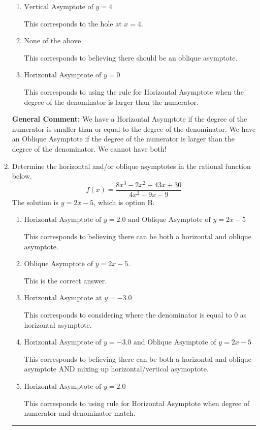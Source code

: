 \documentclass{extbook}[14pt]
\newcommand{\litem}[1]{\item #1

\rule{\textwidth}{0.4pt}}
\begin{document}
\begin{enumerate}
{\begin{enumerate}[label=\Alph*.]
This corresponds to the hole at $x = 0.500$.
\item \( \text{Vertical Asymptote of } y = 4  \)

This corresponds to the hole at $x = 4$.
\item \( \text{None of the above} \)

This corresponds to believing there should be an oblique asymptote.
\item \( \text{Horizontal Asymptote of } y = 0  \)

This corresponds to using the rule for Horizontal Asymptote when the degree of the denominator is larger than the numerator.
\end{enumerate}

\textbf{General Comment:} We have a Horizontal Asymptote if the degree of the numerator is smaller than or equal to the degree of the denominator. We have an Oblique Asymptote if the degree of the numerator is larger than the degree of the denominator. We cannot have both!
}
\litem{
Determine the horizontal and/or oblique asymptotes in the rational function below.
\[ f(x) = \frac{8x^{3} -2 x^{2} -43 x + 30}{4x^{2} +9 x -9} \]The solution is \( y = 2x -5 \), which is option B.\begin{enumerate}[label=\Alph*.]
\item \( \text{Horizontal Asymptote of } y = 2.0 \text{ and Oblique Asymptote of } y = 2x -5 \)

This corresponds to believing there can be both a horizontal and oblique asymptote.
\item \( \text{Oblique Asymptote of } y = 2x -5. \)

This is the correct answer.
\item \( \text{Horizontal Asymptote at } y = -3.0 \)

This corresponds to considering where the denominator is equal to 0 as horizontal asymptote.
\item \( \text{Horizontal Asymptote of } y = -3.0 \text{ and Oblique Asymptote of } y = 2x -5 \)

This corresponds to believing there can be both a horizontal and oblique asymptote AND mixing up horizontal/vertical asymoptote.
\item \( \text{Horizontal Asymptote of } y = 2.0  \)

This corresponds to using rule for Horizontal Asymptote when degree of numerator and denominator match.
\end{enumerate}

}
\end{enumerate}
\end{document}
